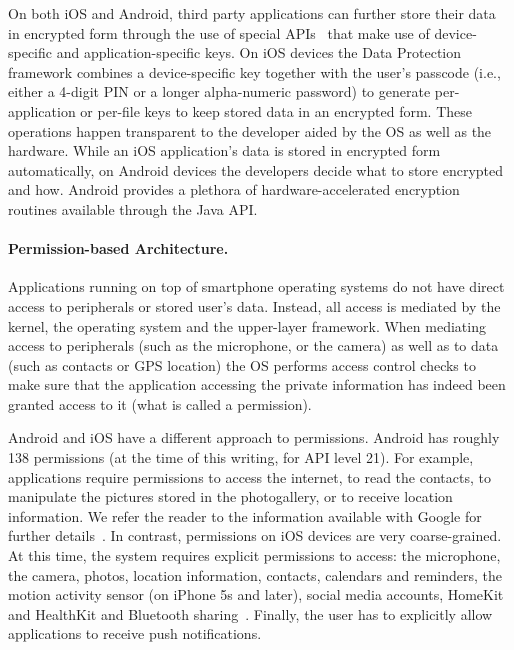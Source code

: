 On both iOS and Android, third party applications can further store their data
in encrypted form through the use of special
APIs~\cite{applesecurity,androidsecurity} that make use of device-specific and
application-specific keys. On iOS devices the Data Protection framework
combines a device-specific key together with the user's passcode (i.e., either
a 4-digit PIN or a longer alpha-numeric password) to generate per-application
or per-file keys to keep stored data in an encrypted form. These operations
happen transparent to the developer aided by the OS as well as the hardware.
While an iOS application's data is stored in encrypted form automatically, on
Android devices the developers decide what to store encrypted and how. Android
provides a plethora of hardware-accelerated encryption routines available
through the Java API.

\paragraph{Permission-based Architecture.} Applications running on top of smartphone operating systems do not have direct access to peripherals or stored user's data. Instead, all access is mediated by the kernel, the operating system and the upper-layer framework. When mediating access to peripherals (such as the microphone, or the camera) as well as to data (such as contacts or GPS location) the OS performs access control checks to make sure that the application accessing the private information has indeed been granted access to it (what is called a permission). 

Android and iOS have a different approach to permissions. Android has roughly 138 permissions (at the time of this writing, for API level 21). For example, applications require permissions to access the internet, to read the contacts, to manipulate the pictures stored in the photogallery, or to receive location information. We refer the reader to the information available with Google for further details~\cite{androidsecurity}. In contrast, permissions on iOS devices are very coarse-grained. At this time, the system requires explicit permissions to access: the microphone, the camera, photos, location information, contacts, calendars and reminders, the motion activity sensor (on iPhone 5s and later), social media accounts, HomeKit and HealthKit and Bluetooth sharing~\cite{applesecurity}. Finally, the user has to explicitly allow applications to receive push notifications.

